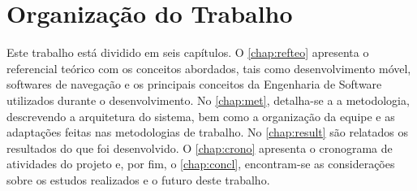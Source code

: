 \section{Organização do Trabalho}

Este trabalho está dividido em seis capítulos. O \autoref{chap:refteo} apresenta o referencial teórico com os conceitos abordados, tais como desenvolvimento móvel, softwares de navegação e os principais conceitos da Engenharia de Software utilizados durante o desenvolvimento. No \autoref{chap:met}, detalha-se a a metodologia, descrevendo a arquitetura do sistema, bem como a organização da equipe e as adaptações feitas nas metodologias de trabalho. No \autoref{chap:result} são relatados os resultados do que foi desenvolvido. O \autoref{chap:crono} apresenta o cronograma de  atividades  do projeto e, por fim, o \autoref{chap:concl}, encontram-se as considerações sobre os estudos realizados e o futuro deste trabalho.
